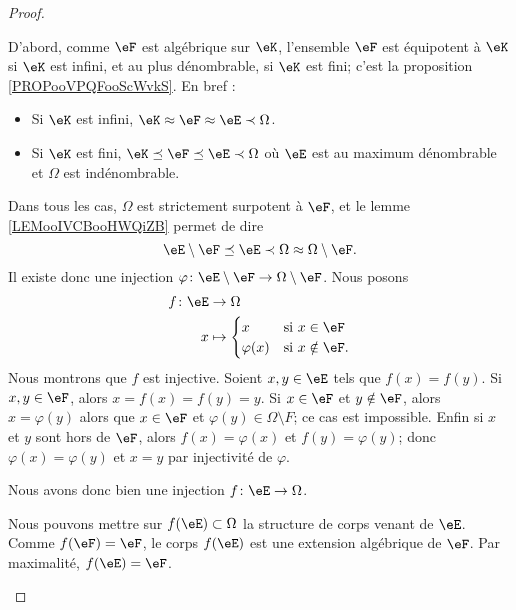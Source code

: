 \begin{proof}
\begin{subproof}
		D'abord, comme \( \eF\) est algébrique sur \( \eK\), l'ensemble \( \eF\) est équipotent à \( \eK\) si \( \eK\) est infini, et au plus dénombrable, si \( \eK\) est fini; c'est la proposition \ref{PROPooVPQFooScWvkS}. En bref :
		\begin{itemize}
			\item Si \( \eK\) est infini, \( \eK\approx \eF\approx \eE\prec\Omega\).
			\item Si \( \eK\) est fini, \(  \eK\preceq \eF\preceq \eE\prec \Omega \) où \( \eE\) est au maximum dénombrable et \( \Omega\) est indénombrable.
		\end{itemize}
		Dans tous les cas, \( \Omega\) est strictement surpotent à \( \eF\), et le lemme \ref{LEMooIVCBooHWQiZB} permet de dire
		\begin{equation}
			\eE\setminus \eF\preceq \eE\prec \Omega\approx\Omega\setminus \eF.
		\end{equation}
		Il existe donc une injection \( \varphi\colon \eE\setminus \eF\to \Omega\setminus \eF\). Nous posons
		\begin{equation}
			\begin{aligned}
				f\colon \eE & \to \Omega                                   \\
				x           & \mapsto \begin{cases}
					                      x          & \text{si } x\in \eF     \\
					                      \varphi(x) & \text{si } x\notin \eF.
				                      \end{cases}
			\end{aligned}
		\end{equation}
		Nous montrons que \( f\) est injective. Soient \( x,y\in \eE\) tels que \( f(x)=f(y)\). Si \( x,y\in \eF\), alors \( x=f(x)=f(y)=y\). Si \(x \in \eF\) et \( y\notin \eF\), alors \( x=\varphi(y)\) alors que \( x\in \eF\) et \( \varphi(y)\in \Omega\setminus F\); ce cas est impossible. Enfin si \( x\) et \( y\) sont hors de \( \eF\), alors \( f(x)=\varphi(x)\) et \( f(y)=\varphi(y)\); donc \( \varphi(x)=\varphi(y)\) et \( x=y\) par injectivité de \( \varphi\).

		Nous avons donc bien une injection \( f\colon \eE\to \Omega\).

		\spitem[La maximalité]

		Nous pouvons mettre sur \( f(\eE)\subset \Omega\) la structure de corps venant de \( \eE\). Comme \( f(\eF)=\eF\), le corps \( f(\eE)\) est une extension algébrique de \( \eF\). Par maximalité, \( f(\eE)=\eF\).


\end{subproof}
\end{proof}

